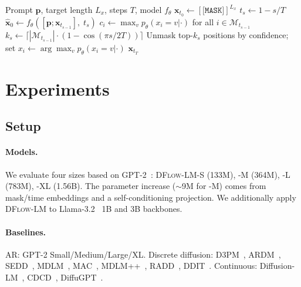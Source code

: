 \documentclass{article}
\newcommand{\ours}{\textsc{DFlow-LM}}
\newcommand{\mask}{\texttt{[MASK]}}
\begin{document}
\begin{algorithm}[t]
\caption{CAU Sampling}
\label{alg:sampling}
\begin{algorithmic}[1]
\REQUIRE Prompt $\mathbf{p}$, target length $L_x$, steps $T$, model $f_\theta$
\STATE $\mathbf{x}_{t_0} \leftarrow [\mask]^{L_x}$ 
    \STATE $t_s \leftarrow 1 - s/T$ 
    \STATE $\hat{\mathbf{x}}_0 \leftarrow f_\theta([\mathbf{p}; \mathbf{x}_{t_{s-1}}],\; t_s)$ 
    \STATE $c_i \leftarrow \max_v p_\theta(x_i{=}v | \cdot)$ for all $i \in \mathcal{M}_{t_{s-1}}$
    \STATE $k_s \leftarrow \lceil |\mathcal{M}_{t_{s-1}}| \cdot (1 - \cos(\pi s / 2T)) \rceil$
    \STATE Unmask top-$k_s$ positions by confidence; set $x_i \leftarrow \arg\max_v p_\theta(x_i{=}v | \cdot)$
\ENDFOR
\RETURN $\mathbf{x}_{t_T}$
\end{algorithmic}
\end{algorithm}

\section{Experiments}
\label{sec:experiments}

\subsection{Setup}
\label{sec:exp:setup}

\paragraph{Models.}
We evaluate four sizes based on GPT-2~\citep{radford2019language}: \ours{}-S (133M), -M (364M), -L (783M), -XL (1.56B).
The parameter increase (${\sim}$9M for -M) comes from mask/time embeddings and a self-conditioning projection.
We additionally apply \ours{} to Llama-3.2~\citep{grattafiori2024llama3} 1B and 3B backbones.

\paragraph{Baselines.}
AR: GPT-2 Small/Medium/Large/XL.
Discrete diffusion: D3PM~\citep{austin2021structured}, ARDM~\citep{hoogeboom2022autoregressive}, SEDD~\citep{lou2024discrete}, MDLM~\citep{sahoo2024simple}, MAC~\citep{shi2024simplified}, MDLM++~\citep{sahoo2025improved}, RADD~\citep{campbell2025refined}, DDIT~\citep{shi2025discrete}.
Continuous: Diffusion-LM~\citep{li2022diffusion}, CDCD~\citep{dieleman2022continuous}, DiffuGPT~\citep{gong2024diffugpt}.
\end{document}
